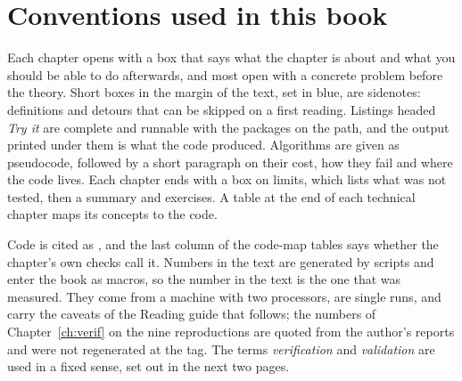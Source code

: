 \section*{Conventions used in this book}

Each chapter opens with a box that says what the chapter is about and what you should be able to do afterwards, and most open with a concrete problem before the theory. Short boxes in the margin of the text, set in blue, are sidenotes: definitions and detours that can be skipped on a first reading. Listings headed \emph{Try it} are complete and runnable with the packages on the path, and the output printed under them is what the code produced. Algorithms are given as pseudocode, followed by a short paragraph on their cost, how they fail and where the code lives. Each chapter ends with a box on limits, which lists what was not tested, then a summary and exercises. A table at the end of each technical chapter maps its concepts to the code.

Code is cited as , and the last column of the code-map tables says whether the chapter's own checks call it. Numbers in the text are generated by scripts and enter the book as macros, so the number in the text is the one that was measured. They come from a machine with two processors, are single runs, and carry the caveats of the Reading guide that follows; the numbers of Chapter~\ref{ch:verif} on the nine reproductions are quoted from the author's reports and were not regenerated at the tag. The terms \emph{verification} and \emph{validation} are used in a fixed sense, set out in the next two pages.
